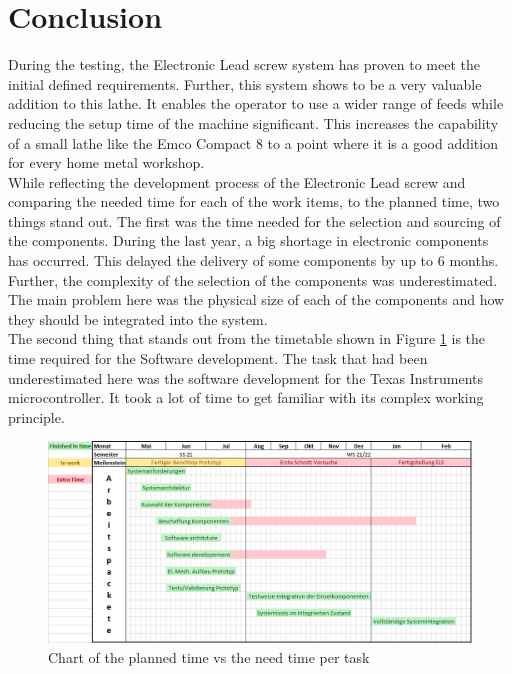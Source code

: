 \section{Conclusion}
During the testing, the Electronic Lead screw system has proven to meet the initial defined requirements. Further, this system shows to be a very valuable addition to this lathe. It enables the operator to use a wider range of feeds while reducing the setup time of the machine significant. This increases the capability of a small lathe like the Emco Compact 8 to a point where it is a good addition for every home metal workshop.\\
While reflecting the development process of the Electronic Lead screw and comparing the needed time for each of the work items, to the planned time, two things stand out. The first was the time needed for the selection and sourcing of the components. During the last year, a big shortage in electronic components has occurred. This delayed the delivery of some components by up to 6 months. Further, the complexity of the selection of the components was underestimated. The main problem here was the physical size of each of the components and how they should be integrated into the system.\\
The second thing that stands out from the timetable shown in Figure \ref{ConcTimeTable} is the time required for the Software development. The task that had been underestimated here was the software development for the Texas Instruments microcontroller. It took a lot of time to get familiar with its complex working principle.
 
 
\begin{figure}
    \begin{center}
    \includegraphics[width=12cm]{Pictures/ConcTimeTable.png}
    \caption[Chart of the planned time vs the need time per task]{Chart of the planned time vs the need time per task}
    \label{ConcTimeTable}
    \end{center}
\end{figure}